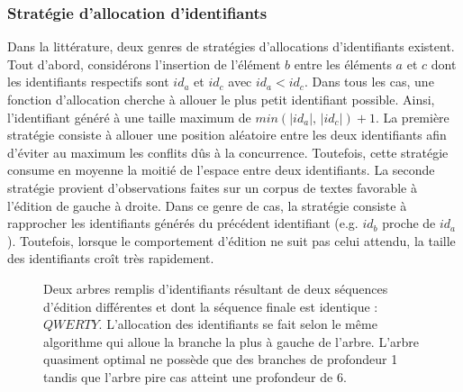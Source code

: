 \subsubsection{Stratégie d'allocation d'identifiants}

Dans la littérature, deux genres de stratégies d'allocations d'identifiants
existent. Tout d'abord, considérons l'insertion de l'élément $b$ entre les
éléments $a$ et $c$ dont les identifiants respectifs sont $id_a$ et $id_c$ avec
$id_a<id_c$. Dans tous les cas, une fonction d'allocation cherche à allouer le
plus petit identifiant possible. Ainsi, l'identifiant généré à une taille
maximum de $min(|id_a|,\, |id_c|)+1$. La première stratégie consiste à allouer
une position aléatoire entre les deux identifiants afin d'éviter au maximum les
conflits dûs à la concurrence. Toutefois, cette stratégie consume en moyenne la
moitié de l'espace entre deux identifiants. La seconde stratégie provient
d'observations faites sur un corpus de textes favorable à l'édition de gauche à
droite. Dans ce genre de cas, la stratégie consiste à rapprocher les
identifiants générés du précédent identifiant (e.g. $id_b$ proche de
$id_a$). Toutefois, lorsque le comportement d'édition ne suit pas celui attendu,
la taille des identifiants croît très rapidement.

\begin{figure}
  \centering
  \hspace{40pt}
  \caption{\label{fig:allocpathexample} Deux arbres remplis d'identifiants
    résultant de deux séquences d'édition différentes et dont la séquence finale
    est identique : $QWERTY$. L'allocation des identifiants se fait selon le
    même algorithme qui alloue la branche la plus à gauche de l'arbre. L'arbre
    quasiment optimal ne possède que des branches de profondeur 1 tandis que
    l'arbre pire cas atteint une profondeur de 6.}
\end{figure}


